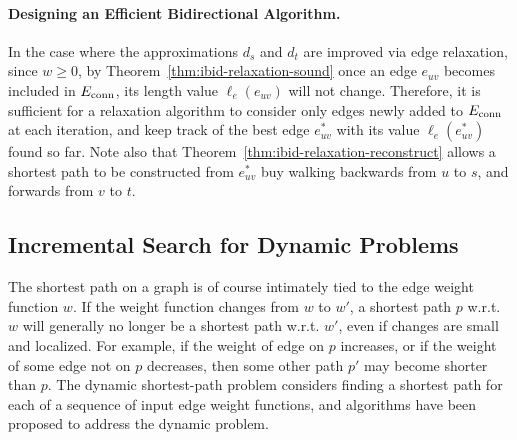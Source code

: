 \paragraph{Designing an Efficient Bidirectional Algorithm.}
In the case where the approximations $d_s$ and $d_t$ are improved
via edge relaxation,
since $w \geq 0$,
by Theorem~\ref{thm:ibid-relaxation-sound}
once an edge $e_{uv}$ becomes included in
$E_{\mbox{\scriptsize conn}}$,
its length value $\ell_e(e_{uv})$ will not change.
Therefore,
it is sufficient for a relaxation algorithm to consider only edges
newly added to $E_{\mbox{\scriptsize conn}}$ at each iteration,
and keep track of the best edge $e^*_{uv}$
with its value $\ell_e(e^*_{uv})$ found so far.
Note also that Theorem~\ref{thm:ibid-relaxation-reconstruct}
allows a shortest path to be constructed from $e^*_{uv}$
buy walking backwards from $u$ to $s$,
and forwards from $v$ to $t$.


\subsection{Incremental Search for Dynamic Problems}
\label{sec:ibid:incremental}

The shortest path on a graph is of course intimately tied to
the edge weight function $w$.
If the weight function changes from $w$ to $w'$,
a shortest path $p$ w.r.t. $w$
will generally no longer be a shortest path w.r.t. $w'$,
even if changes are small and localized.
For example,
if the weight of edge on $p$ increases,
or if the weight of some edge not on $p$ decreases,
then some other path $p'$ may become shorter than $p$.
The dynamic shortest-path problem considers finding a shortest path
for each of a sequence of input edge weight functions,
and algorithms have been proposed to address the dynamic problem.

